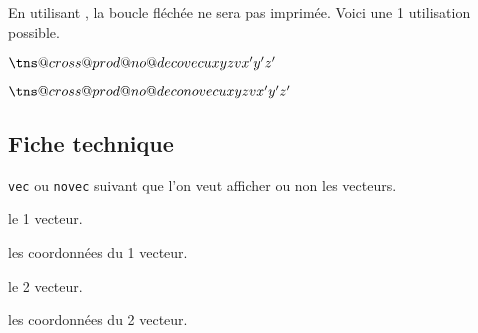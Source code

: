 \documentclass[12pt,a4paper]{article}
\begin{document}



En utilisant , la boucle fléchée ne sera pas imprimée. Voici une 1\iere{} utilisation possible.

\begin{latexex}
\makeatletter
$\tns@cross@prod@no@deco%
     {vec}          %
     {u}{x}{y}{z}   %
     {v}{x'}{y'}{z'}$
\makeatother
\end{latexex}





\begin{latexex}
\makeatletter
$\tns@cross@prod@no@deco%
     {novec}        %
     {u}{x}{y}{z}   %
     {v}{x'}{y'}{z'}$
\makeatother
\end{latexex}




\subsection{Fiche technique}




 \verb+vec+ ou \verb+novec+ suivant que l'on veut afficher ou non les vecteurs. 

 le 1\ier{} vecteur.

 les coordonnées du 1\ier{} vecteur.

 le 2\ieme{} vecteur.

 les coordonnées du 2\ieme{} vecteur.
\end{document}
